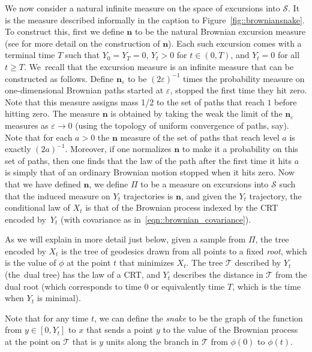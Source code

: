 \documentclass[10pt]{amsart}
\let\mathcal\mathscr
\let\oldS\S
\let\epsilon\varepsilon
\theoremstyle{plain}
\numberwithin{theorem}{section}
\theoremstyle{definition}
\newcommand{\CT}{{\mathcal T}}\let\treespace\CT
\newcommand{\snake}{{\mathcal S}}
\renewcommand{\S}{{\mathbf S}}
\newcommand{\excursion}{{\boldsymbol n}}
\let\snakeexcursionmeasure \Pi
\begin{document}
We now consider a natural infinite measure on the space of excursions into $\snake$. It is the measure described informally in the caption to Figure~\ref{fig::browniansnake}. To construct this, first we define $\excursion$ to be the natural Brownian excursion measure (see \cite[Chap.\,XII, \oldS 4]{ry99martingales} for more detail on the construction of $\excursion$).
Each such excursion comes with a terminal time $T$ such that $Y_0 = Y_T = 0$, $Y_t > 0$ for $t \in (0,T)$, and $Y_t = 0$ for all $t \geq T$. We~recall that the excursion measure is an infinite measure that can be constructed as follows. Define $\excursion_\epsilon$ to be $(2\epsilon)^{-1}$ times the probability measure on one-dimensional Brownian paths started at $\epsilon$, stopped the first time they hit zero. Note that this measure assigns mass 1/2 to the set of paths that reach $1$ before hitting zero. The measure $\excursion$ is obtained by taking the weak the limit of the $\excursion_\epsilon$ measures as $\epsilon \to 0$ (using the topology of uniform convergence of paths, say). Note that for each $a>0$ the $\excursion$ measure of the set of paths that reach level $a$ is exactly $(2a)^{-1}$. Moreover, if one normalizes $\excursion$ to make it a probability on this set of paths, then one finds that the law of the path after the first time it hits $a$ is simply that of an ordinary Brownian motion stopped when it hits zero. Now that we have defined $\excursion$, we define $\snakeexcursionmeasure$ to be a measure on excursions into $\snake$ such that the induced measure on $Y_t$ trajectories is $\excursion$, and given the $Y_t$ trajectory, the conditional law of $X_t$ is that of the Brownian process indexed by the CRT encoded by~$Y_t$ (\ie with covariance as in~\eqref{eqn::brownian_covariance}).

As we will explain in more detail just below, given a sample from $\snakeexcursionmeasure$, the tree encoded by $X_t$ is the tree of geodesics drawn from all points to a fixed \emph{root}, which is the value of $\phi$ at the point $t$ that minimizes $X_t$. The tree $\CT$ described by $Y_t$ (the~dual tree) has the law of a CRT, and $Y_t$ describes the distance in $\CT$ from the dual root (which corresponds to time $0$ or equivalently time $T$, which is the time when $Y_t$ is minimal).

Note that for any time $t$, we can define the \emph{snake} to be the graph of the function from $y\in [0,Y_t]$ to $x$ that sends a point $y$ to the value of the Brownian process at the point on $\CT$ that is $y$ units along the branch in $\mathcal T$ from $\phi(0)$ to $\phi(t)$.
\end{document}
